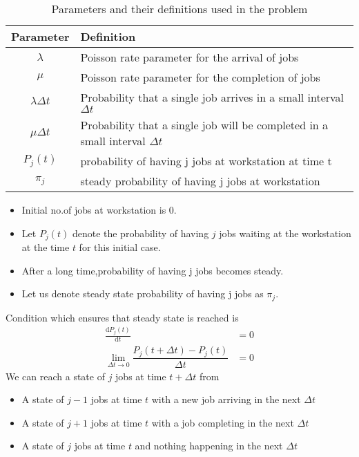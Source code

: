  \begin{table}[h]
\begin{tabular}{|c|p{6cm}|}
\hline
\textbf{Parameter} & \textbf{Definition}                               \\ \hline
$\lambda$          & Poisson rate parameter for the arrival of jobs    \\ \hline
$\mu$              & Poisson rate parameter for the completion of jobs \\ \hline
$\lambda \Delta t$ & Probability that a single job arrives in a small interval $\Delta t$\\\hline 
$\mu \Delta t$ & Probability that a single job will be completed in a small interval $\Delta t$\\\hline 
$P_j(t)$             & probability of having j jobs at workstation at time t \\\hline
$\pi_j$            & steady probability of having j jobs at workstation\\\hline
\end{tabular}
\caption{Parameters and their definitions used in the problem}
\label{me2021-42:tab:parameters}
\end{table}
 \begin{itemize}
     \item  Initial no.of jobs at workstation is 0.
     \item Let $P_{j}(t)$ denote the probability of having $j$ jobs waiting at the workstation at the time $t$ for this initial case.
     \item After a long time,probability of having  j jobs becomes steady.
     \item Let us denote steady state probability of having j jobs as $\pi_j$.
 \end{itemize}
 Condition which ensures that steady state is reached is
 \begin{align}
     \frac{\text{d}P_j(t)}{\text{d}t}&=0\\
     \lim_{\Delta t\rightarrow 0}\dfrac{P_j(t+\Delta t)-P_j (t)}{\Delta t}&=0\label{me2021-42:steady-condition}
 \end{align}
  We can reach a state of $j$ jobs at time $t+\Delta t$ from
  \begin{itemize}
      \item A state of $j-1$ jobs at time $t$ with a new job arriving in the next $\Delta t$
      \item A state of $j+1$ jobs at time $t$ with a job completing in the next $\Delta t$
      \item A state of $j$ jobs at time $t$ and nothing happening in the next $\Delta t$
  \end{itemize}
